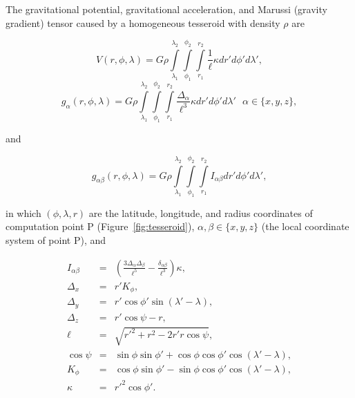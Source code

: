 \documentclass[paper,twocolumn,twoside]{geophysics}
\begin{document}
The gravitational potential,
gravitational acceleration,
and Marussi (gravity gradient) tensor
caused by a homogeneous tesseroid
with density $\rho$
are \citep{Grombein2013}

\begin{equation}
    V(r,\phi,\lambda) = G \rho
        \int\limits_{\lambda_1}^{\lambda_2}
        \int\limits_{\phi_1}^{\phi_2}
        \int\limits_{r_1}^{r_2}
        \frac{1}{\ell} \kappa  dr' d\phi' d\lambda',
    \label{eq:tesspot}
\end{equation}
\begin{equation}
    g_{\alpha}(r,\phi,\lambda) = G \rho
        \int\limits_{\lambda_1}^{\lambda_2}
        \int\limits_{\phi_1}^{\phi_2}
        \int\limits_{r_1}^{r_2}
        \frac{\Delta_{\alpha}}{\ell^3} \kappa dr' d\phi' d\lambda'
        \ \ \ \alpha \in \{x,y,z\},
    \label{eq:tessgrav}
\end{equation}

\noindent
and

\begin{equation}
    g_{\alpha\beta}(r,\phi,\lambda) = G \rho
        \int\limits_{\lambda_1}^{\lambda_2}
        \int\limits_{\phi_1}^{\phi_2}
        \int\limits_{r_1}^{r_2}
        I_{\alpha\beta}
        dr' d\phi' d\lambda',
    \label{eq:tesstensor}
\end{equation}

\noindent
in which
$(\phi, \lambda, r)$ are
the latitude, longitude, and radius
coordinates of computation point P (Figure~\ref{fig:tesseroid}),
$\alpha,\beta \in \{x,y,z\}$
(the local coordinate system of point P),
and

\begin{eqnarray}
    I_{\alpha\beta} &=&
        \left(
            \frac{3\Delta_{\alpha} \Delta_{\beta}}{\ell^5} -
            \frac{\delta_{\alpha\beta}}{\ell^3}
        \right) \kappa, \\
    \Delta_x &=& r' K_{\phi} , \\
    \Delta_y &=& r' \cos \phi' \sin(\lambda' - \lambda) , \\
    \Delta_z &=& r' \cos \psi - r, \\
    \ell &=& \sqrt{r'^2 + r^2 - 2 r' r \cos \psi} , \\
    \cos\psi &=& \sin\phi\sin\phi' + \cos\phi\cos\phi'
                 \cos(\lambda' - \lambda) , \\
    K_{\phi} &=& \cos\phi\sin\phi' - \sin\phi\cos\phi'
                 \cos(\lambda' - \lambda), \\
    \kappa &=& {r'}^2 \cos \phi'.
\end{eqnarray}
\end{document}
